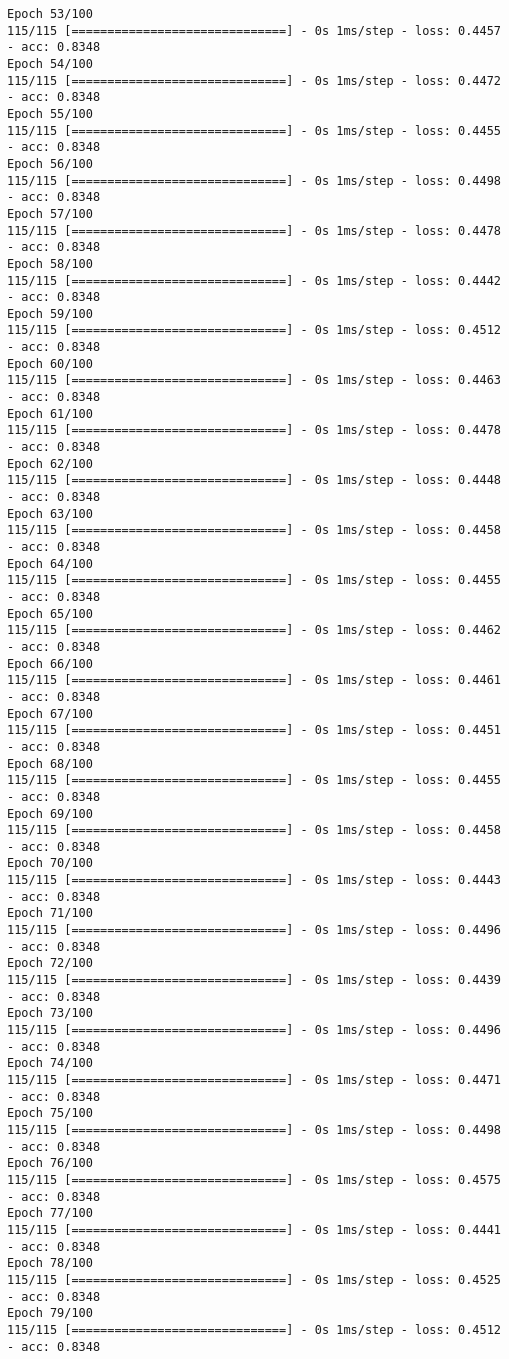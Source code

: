 \documentclass[11pt]{article}
\begin{document}
\begin{Verbatim}[commandchars=\\\{\}]
Epoch 53/100
115/115 [==============================] - 0s 1ms/step - loss: 0.4457 - acc: 0.8348
Epoch 54/100
115/115 [==============================] - 0s 1ms/step - loss: 0.4472 - acc: 0.8348
Epoch 55/100
115/115 [==============================] - 0s 1ms/step - loss: 0.4455 - acc: 0.8348
Epoch 56/100
115/115 [==============================] - 0s 1ms/step - loss: 0.4498 - acc: 0.8348
Epoch 57/100
115/115 [==============================] - 0s 1ms/step - loss: 0.4478 - acc: 0.8348
Epoch 58/100
115/115 [==============================] - 0s 1ms/step - loss: 0.4442 - acc: 0.8348
Epoch 59/100
115/115 [==============================] - 0s 1ms/step - loss: 0.4512 - acc: 0.8348
Epoch 60/100
115/115 [==============================] - 0s 1ms/step - loss: 0.4463 - acc: 0.8348
Epoch 61/100
115/115 [==============================] - 0s 1ms/step - loss: 0.4478 - acc: 0.8348
Epoch 62/100
115/115 [==============================] - 0s 1ms/step - loss: 0.4448 - acc: 0.8348
Epoch 63/100
115/115 [==============================] - 0s 1ms/step - loss: 0.4458 - acc: 0.8348
Epoch 64/100
115/115 [==============================] - 0s 1ms/step - loss: 0.4455 - acc: 0.8348
Epoch 65/100
115/115 [==============================] - 0s 1ms/step - loss: 0.4462 - acc: 0.8348
Epoch 66/100
115/115 [==============================] - 0s 1ms/step - loss: 0.4461 - acc: 0.8348
Epoch 67/100
115/115 [==============================] - 0s 1ms/step - loss: 0.4451 - acc: 0.8348
Epoch 68/100
115/115 [==============================] - 0s 1ms/step - loss: 0.4455 - acc: 0.8348
Epoch 69/100
115/115 [==============================] - 0s 1ms/step - loss: 0.4458 - acc: 0.8348
Epoch 70/100
115/115 [==============================] - 0s 1ms/step - loss: 0.4443 - acc: 0.8348
Epoch 71/100
115/115 [==============================] - 0s 1ms/step - loss: 0.4496 - acc: 0.8348
Epoch 72/100
115/115 [==============================] - 0s 1ms/step - loss: 0.4439 - acc: 0.8348
Epoch 73/100
115/115 [==============================] - 0s 1ms/step - loss: 0.4496 - acc: 0.8348
Epoch 74/100
115/115 [==============================] - 0s 1ms/step - loss: 0.4471 - acc: 0.8348
Epoch 75/100
115/115 [==============================] - 0s 1ms/step - loss: 0.4498 - acc: 0.8348
Epoch 76/100
115/115 [==============================] - 0s 1ms/step - loss: 0.4575 - acc: 0.8348
Epoch 77/100
115/115 [==============================] - 0s 1ms/step - loss: 0.4441 - acc: 0.8348
Epoch 78/100
115/115 [==============================] - 0s 1ms/step - loss: 0.4525 - acc: 0.8348
Epoch 79/100
115/115 [==============================] - 0s 1ms/step - loss: 0.4512 - acc: 0.8348

\end{Verbatim}
\end{document}
